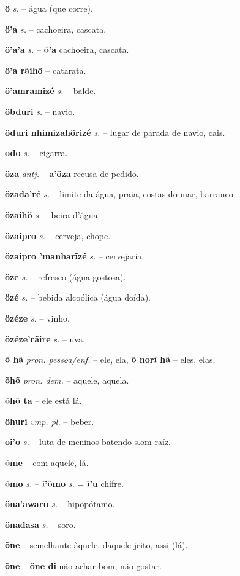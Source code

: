 \textbf{ö} \textit{s.} -- água (que corre).

\textbf{ö'a} \textit{s.} -- cachoeira, cascata.

\textbf{ö'a'a} \textit{s.} -- \textbf{õ'a} cachoeira, cascata.

\textbf{ö'a rãihö} -- catarata.

\textbf{ö'amramizé} \textit{s.} -- balde.

\textbf{öbduri} \textit{s.} -- navio.

\textbf{öduri nhimizahörizé} \textit{s.} -- lugar de parada de navio, cais.

\textbf{odo} \textit{s.} -- cigarra.

\textbf{öza} \textit{antj.} -- \textbf{a'öza} recusa de pedido.

\textbf{özada'ré} \textit{s.} -- limite da água, praia, costas do mar, barranco.

\textbf{özaihö} \textit{s.} -- beira-d'água.

\textbf{özaipro} \textit{s.} -- cerveja, chope.

\textbf{özaipro 'manharĩzé} \textit{s.} -- cervejaria.

\textbf{öze} \textit{s.} -- refresco (água gostosa).

\textbf{özé} \textit{s.} -- bebida alcoólica (água doída).

\textbf{özéze} \textit{s.} -- vinho.

\textbf{özéze'rãire} \textit{s.} -- uva.

\textbf{õ hã} \textit{pron. pessoa/enf.} -- ele, ela, \textbf{õ norĩ hã} -- eles, elas.

\textbf{õhõ} \textit{pron. dem.} -- aquele, aquela.

\textbf{õhõ ta} -- ele está lá.

\textbf{öhuri} \textit{vmp. pl.} -- beber.

\textbf{oi'o} \textit{s.} -- luta de meninos batendo-s.om raíz.

\textbf{õme} -- com aquele, lá.

\textbf{õmo} \textit{s.} -- \textbf{ĩ'õmo} \textit{s.} = \textbf{ĩ'u} chifre.

\textbf{öna'awaru} \textit{s.} -- hipopótamo.

\textbf{önadasa} \textit{s.} -- soro.

\textbf{õne} -- semelhante àquele, daquele jeito, assi (lá).

\textbf{õne} -- \textbf{öne di} não achar bom, não gostar.

